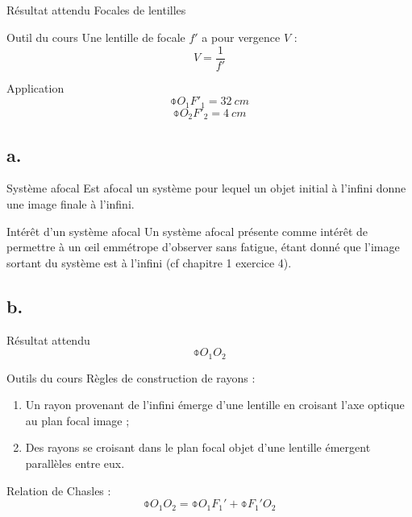 \documentclass[../main/main.tex]{subfiles}
\begin{document}
\subsection{}

\begin{NCprop}{Résultat attendu}
    Focales de lentilles
\end{NCprop}

\begin{NCdemo}{Outil du cours}
    Une lentille de focale $f'$ a pour vergence $V$ :
    \[ V = \frac{1}{f'} \]
\end{NCdemo}

\begin{NCexem}{Application}
    \[ \boxed{\obar{O_1F'_1} = \SI{32}{cm}} \]
    \[ \boxed{\obar{O_2F'_2} = \SI{4}{cm}} \]
\end{NCexem}

\subsection{a.}
\begin{defi}{Système afocal}
    Est afocal un système pour lequel un objet initial à l'infini donne une
    image finale à l'infini.
\end{defi}

\begin{inte}{Intérêt d'un système afocal}
    Un système afocal présente comme intérêt de permettre à un œil emmétrope
    d'observer sans fatigue, étant donné que l'image sortant du système est à
    l'infini (cf chapitre 1 exercice 4).
\end{inte}

\setcounter{subsection}{1}
\subsection{b.}
\begin{NCprop}{Résultat attendu}
    $$\obar{O_1O_2}$$
\end{NCprop}

\begin{NCdemo}{Outils du cours}
    Règles de construction de rayons :
    \begin{enumerate}

        \item Un rayon provenant de l'infini émerge d'une lentille en croisant
            l'axe optique au plan focal image ;

        \item Des rayons se croisant dans le plan focal objet d'une lentille
            émergent parallèles entre eux.
    \end{enumerate}
    Relation de Chasles :
    \[ \obar{O_1O_2} = \obar{O_1F_1'} + \obar{F_1'O_2} \]
\end{NCdemo}
\end{document}
